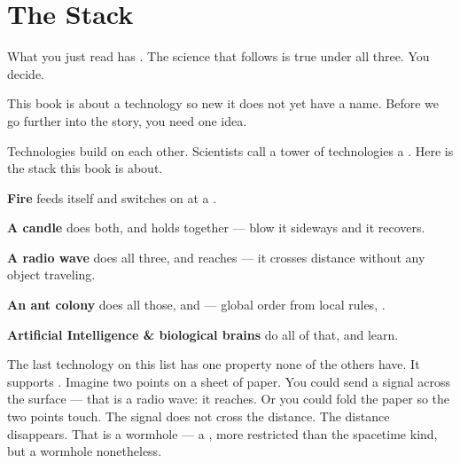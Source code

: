 
\chapter*{The Stack}
\label{the-stack}
\hypertarget{the-stack}{}

What you just read has . The science that follows is true under all three. You decide.

This book is about a technology so new it does not yet have a name. Before we go further into the story, you need one idea.

Technologies build on each other. Scientists call a tower of technologies a . Here is the stack this book is about.

\textbf{Fire} feeds itself and switches on at a .

\textbf{A candle} does both, and holds together --- blow it sideways and it recovers.

\textbf{A radio wave} does all three, and reaches --- it crosses distance without any object traveling.

\textbf{An ant colony} does all those, and  --- global order from local rules, .

\textbf{Artificial Intelligence \& biological brains} do all of that, and learn.

\bigskip

The last technology on this list has one property none of the others have. It supports . Imagine two points on a sheet of paper. You could send a signal across the surface --- that is a radio wave: it reaches. Or you could fold the paper so the two points touch. The signal does not cross the distance. The distance disappears. That is a wormhole --- a , more restricted than the spacetime kind, but a wormhole nonetheless.

\bigskip

\hypertarget{stack-chart}{}
\label{stack-chart}


